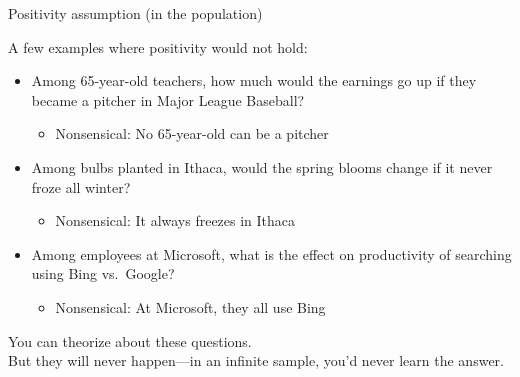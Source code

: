 \documentclass{beamer}
\renewcommand\P{\text{P}}
\begin{document}

\begin{frame}{Positivity assumption (in the population)}

A few examples where positivity would not hold: \pause
\begin{itemize}
\item Among 65-year-old teachers, how much would the earnings go up if they became a pitcher in Major League Baseball?
\begin{itemize} \pause
\item Nonsensical: No 65-year-old can be a pitcher
\end{itemize} \pause
\item Among bulbs planted in Ithaca, would the spring blooms change if it never froze all winter?
\begin{itemize} \pause
\item Nonsensical: It always freezes in Ithaca
\end{itemize} \pause
\item Among employees at Microsoft, what is the effect on productivity of searching using Bing vs.~Google?
\begin{itemize} \pause
\item Nonsensical: At Microsoft, they all use Bing
\end{itemize}
\end{itemize} \pause
You can theorize about these questions.\pause \\
But they will never happen---in an infinite sample, you'd never learn the answer.

\end{frame}
\end{document}
